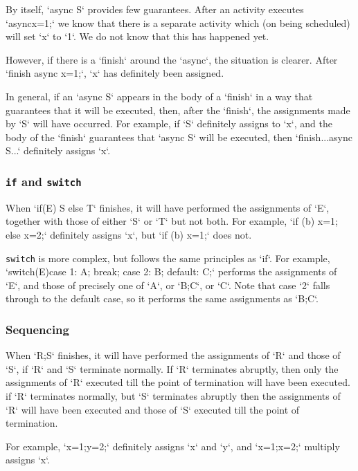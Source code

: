 By itself, \xcd`async S` provides few guarantees.  After an activity
executes \xcd`async{x=1;}` we know that there is a separate activity
which (on being scheduled) will set \xcd`x` to \xcd`1`.  We do not
know that this has happened yet.

However, if there is a \xcd`finish` around the \xcd`async`, the situation is
clearer.  After \xcd`finish async x=1;`, \xcd`x` has definitely been
assigned.  

In general, if an \xcd`async S` appears in the body of a \xcd`finish` in a way
that guarantees that it will be executed, then, after the \xcd`finish`, the
assignments made by \xcd`S` will have occurred.  For example, if \xcd`S`
definitely assigns to \xcd`x`, and the body of the \xcd`finish` guarantees
that \xcd`async S` will be executed, then \xcd`finish{...async S...}`
definitely assigns \xcd`x`.

\subsubsection{{\tt if} and {\tt switch}}

When \xcd`if(E) S else T` finishes, it will have performed the assignments of
\xcd`E`, together with those of either \xcd`S` or \xcd`T` but not both.  For
example, \xcd`if (b) x=1; else x=2;` definitely assigns \xcd`x`,
but \xcd`if (b) x=1;` does not.

{\tt switch} is more complex, but follows the same principles as \xcd`if`.
For example, \xcd`switch(E){case 1: A; break; case 2: B; default: C;}`  
performs the assignments of \xcd`E`, and those of precisely one of \xcd`A`, or
\xcd`B;C`, or \xcd`C`.  Note that case \xcd`2` falls through to the default
case, so it performs the same assignments as \xcd`B;C`.

\subsubsection{Sequencing}

When \xcd`R;S` finishes, it will have performed the assignments of \xcd`R` and
those of \xcd`S`, if \xcd`R` and \xcd`S` terminate normally. If
\xcd`R` terminates abruptly, then only the assignments of \xcd`R`
executed till the point of termination will have been executed. if
\xcd`R` terminates normally, but \xcd`S` terminates abruptly then the
assignments of \xcd`R` will have been executed and those of \xcd`S`
executed till the point of termination. 

For example, \xcd`x=1;y=2;` definitely assigns \xcd`x` and 
\xcd`y`, and \xcd`x=1;x=2;` multiply assigns \xcd`x`. 


